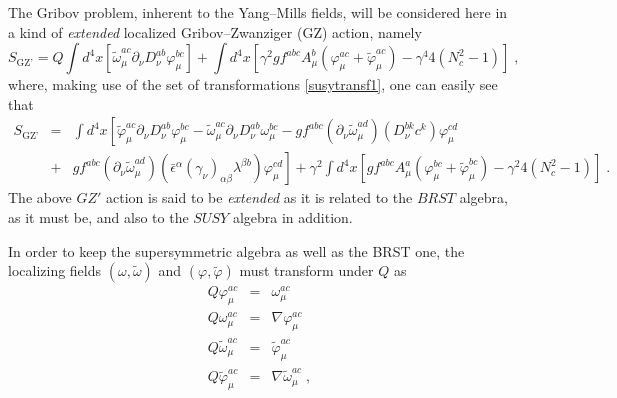 \begin{appendix}
\noindent The Gribov problem, inherent to the Yang--Mills fields, will be considered here in a kind of {\it extended} localized Gribov--Zwanziger (GZ) action, namely
\begin{equation}
S_\text{GZ'} = Q\int d^{4}x \left[\tilde{\omega}^{ac}_{\mu}\partial_{\nu}D_{\nu}^{ab}\varphi^{bc}_{\mu} \right] + \int d^{4}x \left[\gamma^{2}gf^{abc}A^{b}_{\mu}(\varphi^{ac}_{\mu}+\tilde{\varphi}^{ac}_{\mu})  - \gamma^{4}4(N_{c}^{2}-1)\right]\;,
\end{equation}
\noindent
where, making use of the set of transformations \eqref{susytransf1}, one can easily see that
\begin{eqnarray}
\label{gzac}
S_\text{GZ'} &=& \int d^{4}x \left[ \tilde{\varphi}^{ac}_{\mu}\partial_{\nu}D_{\nu}^{ab}\varphi^{bc}_{\mu} - \tilde{\omega}^{ac}_{\mu}\partial_{\nu}D_{\nu}^{ab}\omega^{bc}_{\mu} - gf^{abc}(\partial_{\nu}\tilde{\omega}^{ad}_{\mu})(D^{bk}_{\nu}c^{k})\varphi^{cd}_{\mu} \right. \nonumber \\
&+& \left. gf^{abc}(\partial_{\nu}\tilde{\omega}^{ad}_{\mu})(\bar{\epsilon}^\alpha(\gamma_\nu)_{\alpha\beta}\lambda^{\beta b})\varphi^{cd}_{\mu}\right] + \gamma^{2} \int d^{4}x \left[ gf^{abc}A^{a}_{\mu}(\varphi^{bc}_{\mu} + \tilde{\varphi}^{bc}_{\mu}) - \gamma^{2}4(N_{c}^{2}-1)\right]\;.
\end{eqnarray}
The above $GZ'$ action is said to be {\it extended} as it is related to the $BRST$ algebra, as it must be, and also to the $SUSY$ algebra in addition.

\noindent In order to keep the supersymmetric algebra as well as the BRST one, the localizing fields $(\omega,\tilde{\omega})$ and $(\varphi,\tilde{\varphi})$ must transform under $Q$ as 
\begin{eqnarray}
\label{lcf}
Q\varphi^{ac}_{\mu} &=& \omega^{ac}_{\mu} \nonumber \\
Q\omega^{ac}_{\mu} &=& \nabla\varphi^{ac}_{\mu} \nonumber \\
Q\tilde{\omega}^{ac}_{\mu} &=& \tilde{\varphi}^{ac}_{\mu} \nonumber \\
Q\tilde{\varphi}^{ac}_{\mu} &=& \nabla\tilde{\omega}^{ac}_{\mu}\;, \nonumber \\
\end{eqnarray}


\end{appendix}
